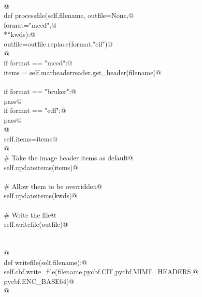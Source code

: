 \documentclass[10pt,a4paper,twoside,notitlepage]{article}
\begin{document}
\begin{flushleft}
\begin{minipage}{\linewidth}
\begin{list}{}{}
\mbox{}\verb@@\\
\mbox{}\verb@        @\\
\mbox{}\verb@    def processfile(self,filename, outfile=None,@\\
\mbox{}\verb@                    format="mccd",@\\
\mbox{}\verb@                    **kwds):@\\
\mbox{}\verb@        outfile=outfile.replace(format,"cif")@\\
\mbox{}\verb@        @\\
\mbox{}\verb@        if format == "mccd":@\\
\mbox{}\verb@            items = self.marheaderreader.get_header(filename)@\\
\mbox{}\verb@@\\
\mbox{}\verb@        if format == "bruker":@\\
\mbox{}\verb@            pass@\\
\mbox{}\verb@        if format == "edf":@\\
\mbox{}\verb@            pass@\\
\mbox{}\verb@        @\\
\mbox{}\verb@        self.items=items@\\
\mbox{}\verb@        @\\
\mbox{}\verb@        # Take the image header items as default@\\
\mbox{}\verb@        self.updateitems(items)@\\
\mbox{}\verb@@\\
\mbox{}\verb@        # Allow them to be overridden@\\
\mbox{}\verb@        self.updateitems(kwds)@\\
\mbox{}\verb@@\\
\mbox{}\verb@        # Write the file@\\
\mbox{}\verb@        self.writefile(outfile)@\\
\mbox{}\verb@@\\
\mbox{}\verb@@\\
\mbox{}\verb@        @\\
\mbox{}\verb@    def writefile(self,filename):@\\
\mbox{}\verb@        self.cbf.write_file(filename,pycbf.CIF,pycbf.MIME_HEADERS,@\\
\mbox{}\verb@                            pycbf.ENC_BASE64)@\\
\mbox{}\verb@        @\\
\mbox{}\verb@@\\

\end{list}
\end{minipage}
\end{flushleft}
\end{document}
